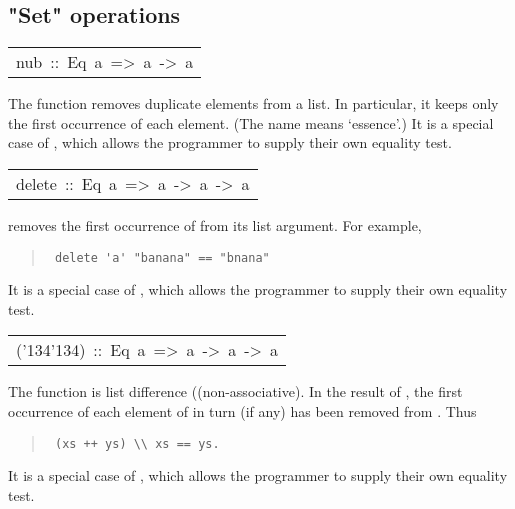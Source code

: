 \subsection{"Set" operations
}
\begin{haddockdesc}
\item[\begin{tabular}{@{}l}
nub\ ::\ Eq\ a\ =>\ {\char 91}a{\char 93}\ ->\ {\char 91}a{\char 93}
\end{tabular}]\haddockbegindoc
The  function removes duplicate elements from a list.
 In particular, it keeps only the first occurrence of each element.
 (The name  means `essence'.)
 It is a special case of , which allows the programmer to supply
 their own equality test.
\par

\end{haddockdesc}
\begin{haddockdesc}
\item[\begin{tabular}{@{}l}
delete\ ::\ Eq\ a\ =>\ a\ ->\ {\char 91}a{\char 93}\ ->\ {\char 91}a{\char 93}
\end{tabular}]\haddockbegindoc
{}  removes the first occurrence of  from its list argument.
 For example,
\par
\begin{quote}
{\haddockverb\begin{verbatim}
 delete 'a' "banana" == "bnana"
\end{verbatim}}
\end{quote}
It is a special case of , which allows the programmer to
 supply their own equality test.
\par

\end{haddockdesc}
\begin{haddockdesc}
\item[\begin{tabular}{@{}l}
({\char '134}{\char '134})\ ::\ Eq\ a\ =>\ {\char 91}a{\char 93}\ ->\ {\char 91}a{\char 93}\ ->\ {\char 91}a{\char 93}
\end{tabular}]\haddockbegindoc
The  function is list difference ((non-associative).
 In the result of   , the first occurrence of each element of
  in turn (if any) has been removed from .  Thus
\par
\begin{quote}
{\haddockverb\begin{verbatim}
 (xs ++ ys) \\ xs == ys.
\end{verbatim}}
\end{quote}
It is a special case of , which allows the programmer
 to supply their own equality test.
\par

\end{haddockdesc}
